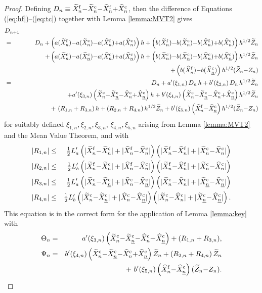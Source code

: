 \documentclass[review]{siamart190516}
\def \tZ {{\widetilde{Z}}}
\def \tXfn {{\widetilde{X}^{\rm f}_n}}
\def \tXcn {{\widetilde{X}^{\rm c}_n}}
\def \tXcl {{\widetilde{X}^{\rm c}_{\underline{n}}}}
\def \hXfn {{\widehat{X}^{\rm f}_n}}
\def \hXcn {{\widehat{X}^{\rm c}_n}}
\def \hXcl {{\widehat{X}^{\rm c}_{\underline{n}}}}
\newcommand{\fracs}[2]{{\textstyle \frac{#1}{#2}}}
\begin{document}
\begin{proof}
Defining $D_n \equiv \tXfn{-}\tXcn {-} \hXfn{+}\hXcn$, 
then the difference of Equations (\ref{eq:hf})--(\ref{eq:tc}) 
together with Lemma \ref{lemma:MVT2} gives
\begin{eqnarray*}
\lefteqn{D_{n+1}}
\\ &=& D_n
+ \left( a(\tXfn) {-} a(\tXcn) {-} a(\hXfn) {+} a(\hXcn) \right) h
+ \left( b(\tXfn) {-} b(\tXcn) {-} b(\hXfn) {+} b(\hXcn) \right) h^{1/2} \tZ_n
\\ && ~~~~
+ \left( a(\tXcn) {-} a(\tXcl) {-} a(\hXcn) {+} a(\hXcl) \right) h
+ \left( b(\tXcn) {-} b(\tXcl) {-} b(\hXcn) {+} b(\hXcl) \right) h^{1/2} \tZ_n
\\ && \hspace{3.4in}
+ \left( b(\hXfn) {-} b(\hXcl) \right) h^{1/2} (\tZ_n {-} Z_n)
\\ &=& D_n
+ a'(\xi_{1,n})\, D_n\, h
+ b'(\xi_{2,n})\, D_n\, h^{1/2} \tZ_n
\\ && ~~~~
+ a'(\xi_{3,n}) \left( \tXcn {-} \tXcl {-} \hXcn {+} \hXcl \right) h
+ b'(\xi_{4,n}) \left( \tXcn {-} \tXcl {-} \hXcn {+} \hXcl \right) h^{1/2} \tZ_n
\\ && ~~~~ +\ (R_{1,n} +  R_{3,n})\, h + (R_{2,n} + R_{4,n})\, h^{1/2} \tZ_n
+ b'(\xi_{5,n}) \left( \hXfn {-} \hXcl \right) h^{1/2} (\tZ_n {-} Z_n)
\end{eqnarray*}
for suitably defined $\xi_{1,n}, \xi_{2,n}, \xi_{3,n}$, $\xi_{4,n}, \xi_{5,n}$ 
arising from Lemma \ref{lemma:MVT2} and the Mean Value Theorem, and with
\begin{eqnarray*}
|R_{1,n}| &\leq& \fracs{1}{2} L'_a
 \left( |\tXfn {-} \tXcn| + |\hXfn {-} \hXcn| \right)
 \left( |\tXfn {-} \hXfn| + |\tXcn {-} \hXcn| \right) \\
|R_{2,n}| &\leq& \fracs{1}{2} L'_b
 \left( |\tXfn {-} \tXcn| + |\hXfn {-} \hXcn| \right)
 \left( |\tXfn {-} \hXfn| + |\tXcn {-} \hXcn| \right) \\
|R_{3,n}| &\leq& \fracs{1}{2} L'_a
 \left( |\tXcn {-} \tXcl| + |\hXcn {-} \hXcl| \right)
 \left( |\tXcn {-} \hXcn| + |\tXcl {-} \hXcl| \right) \\
|R_{4,n}| &\leq& \fracs{1}{2} L'_b
 \left( |\tXcn {-} \tXcl| + |\hXcn {-} \hXcl| \right)
 \left( |\tXcn {-} \hXcn| + |\tXcl {-} \hXcl| \right).
\end{eqnarray*}
This equation is in the correct form for the application of Lemma \ref{lemma:key}
with
\begin{eqnarray*}
  \Theta_n &=&   a'(\xi_{3,n}) \left( \tXcn {-} \tXcl {-} \hXcn {+} \hXcl \right)
+ (R_{1,n} +  R_{3,n}), \\
  \Psi_n &=&  b'(\xi_{4,n}) \left( \tXcn {-} \tXcl {-} \hXcn {+} \hXcl \right) \tZ_n
+ (R_{2,n} + R_{4,n})\, \tZ_n\\
&& +\ b'(\xi_{5,n}) \left( \hXfn {-} \hXcl \right) (\tZ_n {-} Z_n).
\end{eqnarray*}


\end{proof}
\end{document}
